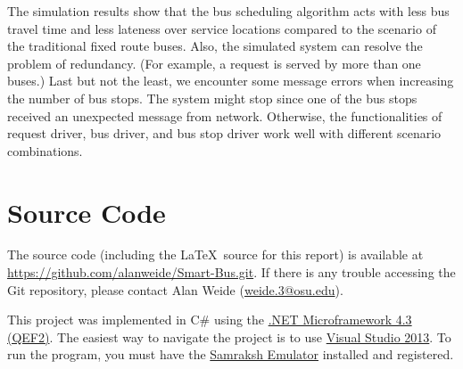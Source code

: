 \documentclass[runningheads]{llncs}
\begin{document}
The simulation results show that the bus scheduling algorithm acts with less bus travel time and less lateness over service locations compared to the scenario of the traditional fixed route buses. Also, the simulated system can resolve the problem of redundancy. (For example, a request is served by more than one buses.) Last but not the least, we encounter some message errors when increasing the number of bus stops. The system might stop since one of the bus stops received an unexpected message from network. Otherwise, the functionalities of request driver, bus driver, and bus stop driver work well with different scenario combinations.

\newpage
\appendix
\section{Source Code}
The source code (including the \LaTeX\ source for this report) is available at \url{https://github.com/alanweide/Smart-Bus.git}. If there is any trouble accessing the Git repository, please contact Alan Weide (\href{mailto:weide.3@osu.edu}{weide.3@osu.edu}).

This project was implemented in C\# using the \href{https://marketplace.visualstudio.com/items?itemName=SteveMaillet.NETMicroFrameworkSDK43QFE2}{.NET Microframework 4.3 (QEF2)}. The easiest way to navigate the project is to use \href{https://visualstudio.microsoft.com/vs/older-downloads/}{Visual Studio 2013}. To run the program, you must have the \href{https://www.dropbox.com/sh/dtcgec1pe3mpkim/AAC318cuhoLaw4AtoL7dYDmYa?dl=0}{Samraksh Emulator} installed and registered.
\end{document}
